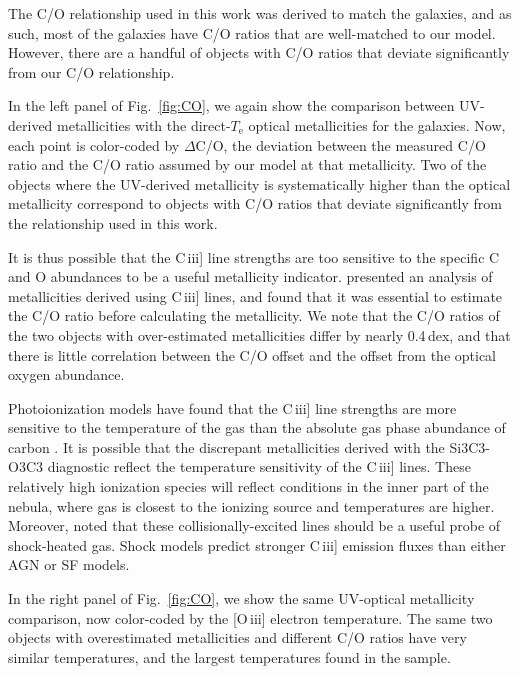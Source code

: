 \documentclass[preprint2]{aastex62}
\newcommand{\oiii}{[O\,{\sc iii}]\xspace}
\newcommand{\ciii}{C\,{\sc iii}]\xspace}
\newcommand{\Te}{\ensuremath{T_{\mathrm{e}}}\xspace}
\begin{document}
The C/O relationship used in this work was derived to match the \citet{Berg+2016} galaxies, and as such, most of the \citet{Berg+2016} galaxies have C/O ratios that are well-matched to our model. However, there are a handful of objects with C/O ratios that deviate significantly from our C/O relationship.

In the left panel of Fig.~\ref{fig:CO}, we again show the comparison between UV-derived metallicities with the direct-\Te optical metallicities for the \citet{Berg+2016} galaxies. Now, each point is color-coded by $\Delta$C/O, the deviation between the measured C/O ratio and the C/O ratio assumed by our model at that metallicity. Two of the objects where the UV-derived metallicity is systematically higher than the optical metallicity correspond to objects with C/O ratios that deviate significantly from the relationship used in this work.

It is thus possible that the \ciii line strengths are too sensitive to the specific C and O abundances to be a useful metallicity indicator. \citet{PerezMontero+2017} presented an analysis of metallicities derived using \ciii lines, and found that it was essential to estimate the C/O ratio before calculating the metallicity. We note that the C/O ratios of the two objects with over-estimated metallicities differ by nearly 0.4\,dex, and that there is little correlation between the C/O offset and the offset from the optical oxygen abundance.

Photoionization models have found that the \ciii line strengths are more sensitive to the temperature of the gas than the absolute gas phase abundance of carbon \citep{Jaskot+2016, Byler+2018}. It is possible that the discrepant metallicities derived with the Si3C3-O3C3 diagnostic reflect the temperature sensitivity of the \ciii lines. These relatively high ionization species will reflect conditions in the inner part of the nebula, where gas is closest to the ionizing source and temperatures are higher. Moreover, \citet{Dopita+1997} noted that these collisionally-excited lines should be a useful probe of shock-heated gas. Shock models predict stronger \ciii emission fluxes than either AGN or SF models.

In the right panel of Fig.~\ref{fig:CO}, we show the same UV-optical metallicity comparison, now color-coded by the \oiii electron temperature. The same two objects with overestimated metallicities and different C/O ratios have very similar temperatures, and the largest temperatures found in the \citet{Berg+2016} sample.
\end{document}
